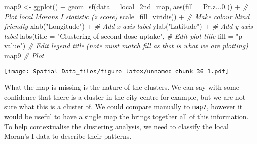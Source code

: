 \documentclass[
]{book}
\newenvironment{Shaded}{\begin{snugshade}}{\end{snugshade}}
\newcommand{\AttributeTok}[1]{\textcolor[rgb]{0.77,0.63,0.00}{#1}}
\newcommand{\CommentTok}[1]{\textcolor[rgb]{0.56,0.35,0.01}{\textit{#1}}}
\newcommand{\FloatTok}[1]{\textcolor[rgb]{0.00,0.00,0.81}{#1}}
\newcommand{\FunctionTok}[1]{\textcolor[rgb]{0.00,0.00,0.00}{#1}}
\newcommand{\NormalTok}[1]{#1}
\newcommand{\OtherTok}[1]{\textcolor[rgb]{0.56,0.35,0.01}{#1}}
\newcommand{\SpecialCharTok}[1]{\textcolor[rgb]{0.00,0.00,0.00}{#1}}
\newcommand{\StringTok}[1]{\textcolor[rgb]{0.31,0.60,0.02}{#1}}
\begin{document}
\begin{Shaded}
\begin{Highlighting}[]
\NormalTok{map9 }\OtherTok{\textless{}{-}} \FunctionTok{ggplot}\NormalTok{() }\SpecialCharTok{+}
  \FunctionTok{geom\_sf}\NormalTok{(}\AttributeTok{data =}\NormalTok{ local\_2nd\_map, }\FunctionTok{aes}\NormalTok{(}\AttributeTok{fill =}\NormalTok{ Pr.z...}\FloatTok{0.}\NormalTok{)) }\SpecialCharTok{+} \CommentTok{\# Plot local Moran\textquotesingle{}s I statistic (z score)}
  \FunctionTok{scale\_fill\_viridis}\NormalTok{() }\SpecialCharTok{+} \CommentTok{\# Make colour blind friendly}
  \FunctionTok{xlab}\NormalTok{(}\StringTok{"Longitude"}\NormalTok{) }\SpecialCharTok{+} \CommentTok{\# Add x{-}axis label}
  \FunctionTok{ylab}\NormalTok{(}\StringTok{"Latitude"}\NormalTok{) }\SpecialCharTok{+} \CommentTok{\# Add y{-}axis label}
  \FunctionTok{labs}\NormalTok{(}\AttributeTok{title =} \StringTok{"Clustering of second dose uptake"}\NormalTok{, }\CommentTok{\# Edit plot title }
       \AttributeTok{fill =} \StringTok{"p{-}value"}\NormalTok{) }\CommentTok{\# Edit legend title (note must match fill as that is what we are plotting)}
\NormalTok{map9 }\CommentTok{\# Plot}
\end{Highlighting}
\end{Shaded}

\texttt{[image: Spatial-Data\_files/figure-latex/unnamed-chunk-36-1.pdf]}

What the map is missing is the nature of the clusters. We can say with some confidence that there is a cluster in the city centre for example, but we are not sure what this is a cluster of. We could compare manually to \texttt{map7}, however it would be useful to have a single map the brings together all of this information. To help contextualise the clustering analysis, we need to classify the local Moran's I data to describe their patterns.
\end{document}
